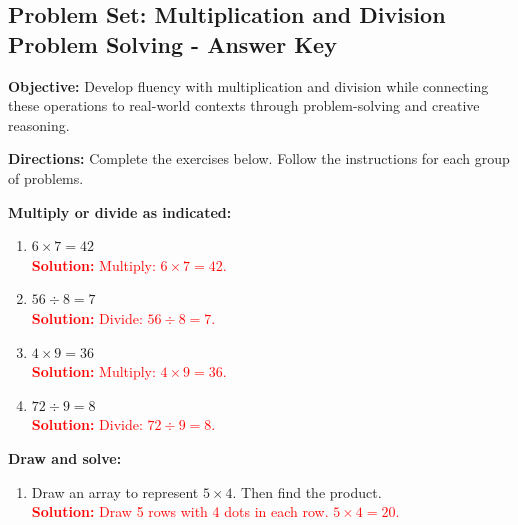 \documentclass[11pt]{article}
\title{}
\date{}
\begin{document}
\subsection*{Problem Set: Multiplication and Division Problem Solving - Answer Key}
\onehalfspacing

\begin{tcolorbox}[colframe=black!40, colback=gray!5, 
coltitle=black, colbacktitle=black!20, fonttitle=\bfseries\Large, 
title=Learning Objective, halign title=center, left=5pt, right=5pt, top=5pt, bottom=15pt]
\textbf{Objective:} Develop fluency with multiplication and division while connecting these operations to real-world contexts through problem-solving and creative reasoning.
\end{tcolorbox}

\begin{tcolorbox}[colframe=black!60, colback=white, 
coltitle=black, colbacktitle=black!15, fonttitle=\bfseries\Large, 
title=Exercises, halign title=center, left=10pt, right=10pt, top=10pt, bottom=60pt]
\textbf{Directions:} Complete the exercises below. Follow the instructions for each group of problems.

\textbf{Multiply or divide as indicated:}
\begin{multicols}{2}
\begin{enumerate}[itemsep=.25em]
    \item  \(6 \times 7 = 42\) \\
    \textcolor{red}{\textbf{Solution:} Multiply: \(6 \times 7 = 42\).}
    
    \item  \(56 \div 8 = 7\) \\
    \textcolor{red}{\textbf{Solution:} Divide: \(56 \div 8 = 7\).}
    
    \item \(4 \times 9 = 36\) \\
    \textcolor{red}{\textbf{Solution:} Multiply: \(4 \times 9 = 36\).}
    
    \item  \(72 \div 9 = 8\) \\
    \textcolor{red}{\textbf{Solution:} Divide: \(72 \div 9 = 8\).}
\end{enumerate}
\end{multicols}

\textbf{Draw and solve:}
\begin{enumerate}[start=5, itemsep=6em]
    \item Draw an array to represent \(5 \times 4\). Then find the product.\\
    \textcolor{red}{\textbf{Solution:} Draw 5 rows with 4 dots in each row. \(5 \times 4 = 20\).}


\end{enumerate}
\end{tcolorbox}
\end{document}
